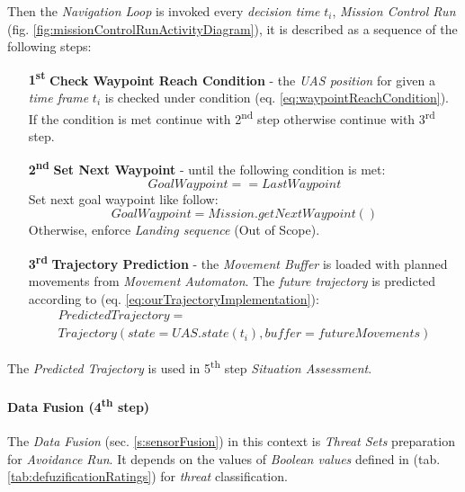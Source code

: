 Then the \emph{Navigation Loop} is invoked  every \emph{decision time} $t_i$, \emph{Mission Control Run} (fig. \ref{fig:missionControlRunActivityDiagram}), it is described as a sequence of the following steps:

\begin{itemize}
    \item[\textbf{1\textsuperscript{st}}] \textbf{Check Waypoint Reach Condition} - the \emph{UAS position} for given a \emph{time frame} $t_i$ is checked under condition (eq. \ref{eq:waypointReachCondition}).  If the condition is met continue with 2\textsuperscript{nd} step otherwise continue with 3\textsuperscript{rd} step.

    \item[\textbf{2\textsuperscript{nd}}] \textbf{Set Next Waypoint} - until the following condition is met:
    \begin{equation*}
        Goal Waypoint == Last Waypoint    
    \end{equation*}
    Set next goal waypoint like follow:
    \begin{equation*}
        Goal Waypoint = Mission.get Next Waypoint()
    \end{equation*}
    Otherwise, enforce \emph{Landing sequence} (Out of Scope).
        
    \item[\textbf{3\textsuperscript{rd}}] \textbf{Trajectory Prediction} - the \emph{Movement Buffer} is loaded with planned movements from \emph{Movement Automaton}. The \emph{future trajectory} is predicted according to (eq. \ref{eq:ourTrajectoryImplementation}):
    \begin{multline*}
        Predicted Trajectory = \\Trajectory(state=UAS.state(t_i),buffer=future Movements)
    \end{multline*}
\end{itemize}

\noindent The \emph{Predicted Trajectory} is used in 5\textsuperscript{th} step \emph{Situation Assessment}.

\paragraph{Data Fusion (4\textsuperscript{th} step)} The \emph{Data Fusion} (sec. \ref{s:sensorFusion}) in this context is \emph{Threat Sets} preparation for \emph{Avoidance Run}. It depends on the values of \emph{Boolean values} defined in (tab. \ref{tab:defuzificationRatings}) for \emph{threat} classification.

